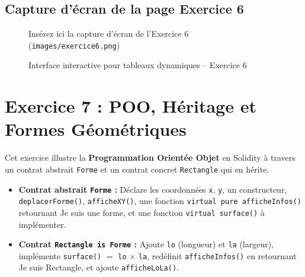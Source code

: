 \documentclass[12pt,a4paper]{report}
\begin{document}
\subsection{Capture d'écran de la page Exercice 6}
\begin{figure}[h!]
    \centering
    \begin{tcolorbox}[colback=red!5,colframe=red!50!black,title=Capture d'écran manquante]
        Insérez ici la capture d'écran de l'Exercice 6 (\texttt{images/exercice6.png})
    \end{tcolorbox}
    \caption{Interface interactive pour tableaux dynamiques -- Exercice 6}
\end{figure}

\newpage

\section{Exercice 7 : POO, Héritage et Formes Géométriques}
Cet exercice illustre la \textbf{Programmation Orientée Objet} en Solidity à travers un contrat
abstrait \texttt{Forme} et un contrat concret \texttt{Rectangle} qui en hérite.

\begin{itemize}
    \item \textbf{Contrat abstrait \texttt{Forme} :} Déclare les coordonnées \texttt{x}, \texttt{y},
          un constructeur, \texttt{deplacerForme()}, \texttt{afficheXY()}, une fonction
          \texttt{virtual pure afficheInfos()} retournant \og{}Je suis une forme\fg{},
          et une fonction \texttt{virtual surface()} à implémenter.
    \item \textbf{Contrat \texttt{Rectangle is Forme} :} Ajoute \texttt{lo} (longueur) et
          \texttt{la} (largeur), implémente \texttt{surface()} $=$ \texttt{lo} $\times$ \texttt{la},
          redéfinit \texttt{afficheInfos()} en retournant \og{}Je suis Rectangle\fg{},
          et ajoute \texttt{afficheLoLa()}.
\end{itemize}
\end{document}

